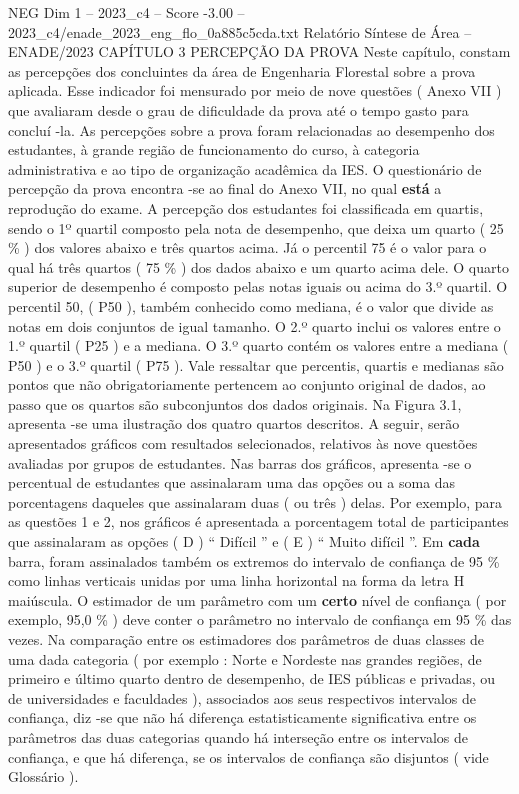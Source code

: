 \begin{textsample}{NEG Dim 1 – 2023\_c4 – Score -3.00 – 2023\_c4/enade\_2023\_eng\_flo\_0a885c5cda.txt}  \label{ex:f1_neg_243}
Relatório Síntese de Área – ENADE/2023 CAPÍTULO 3 PERCEPÇÃO DA PROVA Neste capítulo, constam as percepções dos concluintes da área de Engenharia Florestal sobre a prova aplicada.
Esse indicador foi mensurado por meio de nove questões ( Anexo VII ) que avaliaram desde o grau de dificuldade da prova até o tempo gasto para concluí -la.
As percepções sobre a prova foram relacionadas ao desempenho dos estudantes, à grande região de funcionamento do curso, à categoria administrativa e ao tipo de organização acadêmica da IES.
O questionário de percepção da prova encontra -se ao final do Anexo VII, no qual \textbf{está} a reprodução do exame.
A percepção dos estudantes foi classificada em quartis, sendo o 1º quartil composto pela nota de desempenho, que deixa um quarto ( 25 \% ) dos valores abaixo e três quartos acima.
Já o percentil 75 é o valor para o qual há três quartos ( 75 \% ) dos dados abaixo e um quarto acima dele.
O quarto superior de desempenho é composto pelas notas iguais ou acima do 3.º quartil.
O percentil 50, ( P50 ), também conhecido como mediana, é o valor que divide as notas em dois conjuntos de igual tamanho.
O 2.º quarto inclui os valores entre o 1.º quartil ( P25 ) e a mediana.
O 3.º quarto contém os valores entre a mediana ( P50 ) e o 3.º quartil ( P75 ).
Vale ressaltar que percentis, quartis e medianas são pontos que não obrigatoriamente pertencem ao conjunto original de dados, ao passo que os quartos são subconjuntos dos dados originais.
Na Figura 3.1, apresenta -se uma ilustração dos quatro quartos descritos.
A seguir, serão apresentados gráficos com resultados selecionados, relativos às nove questões avaliadas por grupos de estudantes.
Nas barras dos gráficos, apresenta -se o percentual de estudantes que assinalaram uma das opções ou a soma das porcentagens daqueles que assinalaram duas ( ou três ) delas.
Por exemplo, para as questões 1 e 2, nos gráficos é apresentada a porcentagem total de participantes que assinalaram as opções ( D ) “ Difícil ” e ( E ) “ Muito difícil ”.
Em \textbf{cada} barra, foram assinalados também os extremos do intervalo de confiança de 95 \% como linhas verticais unidas por uma linha horizontal na forma da letra H maiúscula.
O estimador de um parâmetro com um \textbf{certo} nível de confiança ( por exemplo, 95,0 \% ) deve conter o parâmetro no intervalo de confiança em 95 \% das vezes.
Na comparação entre os estimadores dos parâmetros de duas classes de uma dada categoria ( por exemplo : Norte e Nordeste nas grandes regiões, de primeiro e último quarto dentro de desempenho, de IES públicas e privadas, ou de universidades e faculdades ), associados aos seus respectivos intervalos de confiança, diz -se que não há diferença estatisticamente significativa entre os parâmetros das duas categorias quando há interseção entre os intervalos de confiança, e que há diferença, se os intervalos de confiança são disjuntos ( vide Glossário ).

\end{textsample}
